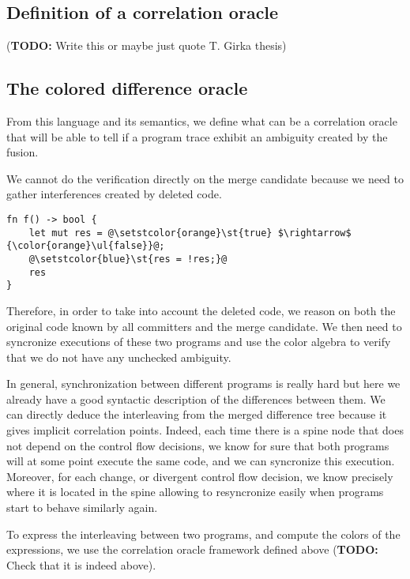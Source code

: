 \documentclass[a4paper,11pt]{article}
\newcommand\todo[1]{{\color{teal}(\textbf{TODO:} #1)}}
\begin{document}
\subsection{Definition of a correlation oracle}
\todo{Write this or maybe just quote T. Girka thesis}

\subsection{The colored difference oracle}
From this language and its semantics, we define what can be a correlation oracle that will be able to tell if a program trace exhibit an ambiguity created by the fusion.

We cannot do the verification directly on the merge candidate because we need to gather interferences created by deleted code.
\begin{lstlisting}[label=lst:del_interference, caption={Example of an ambiguity that would be missed if we don't analyze deleted code.}]
fn f() -> bool {
    let mut res = @\setstcolor{orange}\st{true} $\rightarrow$ {\color{orange}\ul{false}}@;
    @\setstcolor{blue}\st{res = !res;}@
    res
}
\end{lstlisting}

Therefore, in order to take into account the deleted code, we reason on both the original code known by all committers and the merge candidate. We then need to syncronize executions of these two programs and use the color algebra to verify that we do not have any unchecked ambiguity.

In general, synchronization between different programs is really hard but here we already have a good syntactic description of the differences between them. We can directly deduce the interleaving from the merged difference tree because it gives implicit correlation points. Indeed, each time there is a spine node that does not depend on the control flow decisions, we know for sure that both programs will at some point execute the same code, and we can syncronize this execution. Moreover, for each change, or divergent control flow decision, we know precisely  where it is located in the spine allowing to resyncronize easily when programs start to behave similarly again.

To express the interleaving between two programs, and compute the colors of the expressions, we use the correlation oracle framework defined above \todo{Check that it is indeed above}.
\end{document}
